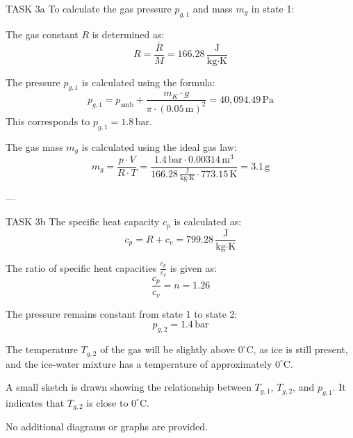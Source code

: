 TASK 3a  
To calculate the gas pressure \( p_{g,1} \) and mass \( m_g \) in state 1:  

The gas constant \( R \) is determined as:  
\[
R = \frac{\bar{R}}{M} = 166.28 \, \frac{\text{J}}{\text{kg·K}}
\]  

The pressure \( p_{g,1} \) is calculated using the formula:  
\[
p_{g,1} = p_{\text{amb}} + \frac{m_K \cdot g}{\pi \cdot \left(0.05 \, \text{m}\right)^2} = 40,094.49 \, \text{Pa}
\]  
This corresponds to \( p_{g,1} = 1.8 \, \text{bar} \).  

The gas mass \( m_g \) is calculated using the ideal gas law:  
\[
m_g = \frac{p \cdot V}{R \cdot T} = \frac{1.4 \, \text{bar} \cdot 0.00314 \, \text{m}^3}{166.28 \, \frac{\text{J}}{\text{kg·K}} \cdot 773.15 \, \text{K}} = 3.1 \, \text{g}
\]  

---

TASK 3b  
The specific heat capacity \( c_p \) is calculated as:  
\[
c_p = R + c_v = 799.28 \, \frac{\text{J}}{\text{kg·K}}
\]  

The ratio of specific heat capacities \( \frac{c_p}{c_v} \) is given as:  
\[
\frac{c_p}{c_v} = n = 1.26
\]  

The pressure remains constant from state 1 to state 2:  
\[
p_{g,2} = 1.4 \, \text{bar}
\]  

The temperature \( T_{g,2} \) of the gas will be slightly above \( 0^\circ\text{C} \), as ice is still present, and the ice-water mixture has a temperature of approximately \( 0^\circ\text{C} \).  

A small sketch is drawn showing the relationship between \( T_{g,1} \), \( T_{g,2} \), and \( p_{g,1} \). It indicates that \( T_{g,2} \) is close to \( 0^\circ\text{C} \).  

No additional diagrams or graphs are provided.